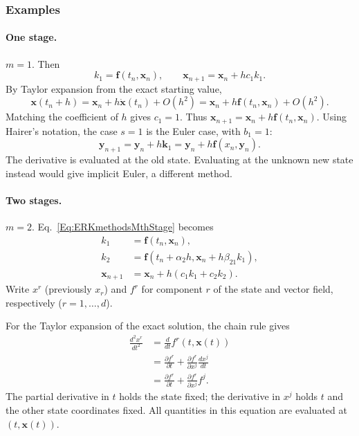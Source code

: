 \subsubsection{Examples}

\paragraph{One stage.} $m=1$. Then
\[
 k_1=\mathbf f(t_n,\mathbf x_n),\qquad
 \mathbf x_{n+1}=\mathbf x_n+hc_1k_1.
\]
By Taylor expansion from the exact starting value,
\[
 \mathbf x(t_n+h)=\mathbf x_n+h\dot{\mathbf x}(t_n)+O(h^2)
                =\mathbf x_n+h\mathbf f(t_n,\mathbf x_n)+O(h^2).
\]
Matching the coefficient of $h$ gives $c_1=1$. Thus
$\mathbf x_{n+1}=\mathbf x_n+h\mathbf f(t_n,\mathbf x_n)$.
Using Hairer's notation, the case $s=1$ is the Euler case, with $b_1=1$:
\begin{equation}\label{Eq:RKEuler}
 \mathbf y_{n+1}=\mathbf y_n+h\mathbf k_1
               =\mathbf y_n+h\mathbf f(x_n,\mathbf y_n).
\end{equation}
The derivative is evaluated at the old state. Evaluating at the unknown
new state instead would give implicit Euler, a different method.

\paragraph{Two stages.} $m=2$. Eq.~\ref{Eq:ERKmethodsMthStage} becomes
\begin{equation}\label{Eq:RKTwoStage}
\begin{aligned}
 k_1&=\mathbf f(t_n,\mathbf x_n),\\
 k_2&=\mathbf f(t_n+\alpha_2h,\mathbf x_n+h\beta_{21}k_1),\\
 \mathbf x_{n+1}&=\mathbf x_n+h(c_1k_1+c_2k_2).
\end{aligned}
\end{equation}
Write $x^r$ (previously $x_r$) and $f^r$ for component $r$ of the
state and vector field, respectively ($r=1,\dots,d$).

For the Taylor expansion of the exact solution, the chain rule gives
\begin{equation}\label{Eq:RKSecondDerivative}
\begin{aligned}
 \frac{d^2x^r}{dt^2}
 &=\frac{d}{dt}f^r(t,\mathbf x(t))\\
 &=\frac{\partial f^r}{\partial t}
   +\frac{\partial f^r}{\partial x^j}\frac{dx^j}{dt}\\
 &=\frac{\partial f^r}{\partial t}
   +\frac{\partial f^r}{\partial x^j}f^j.
\end{aligned}
\end{equation}
The partial derivative in $t$ holds the state fixed; the derivative in
$x^j$ holds $t$ and the other state coordinates fixed. All quantities
in this equation are evaluated at $(t,\mathbf x(t))$.

